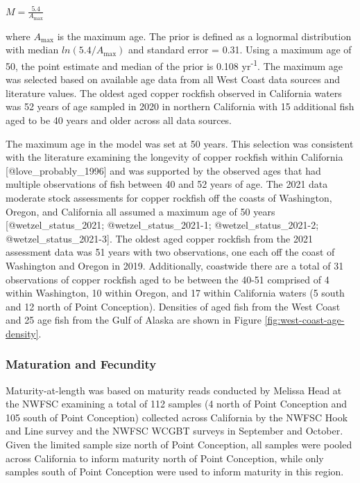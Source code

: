 \documentclass[11pt,
  letterpaper,
]{article}
\begin{document}
\begin{centering}

$M=\frac{5.4}{A_{\text{max}}}$

\end{centering}

\vspace{0.5cm}

where \(A_{\text{max}}\) is the maximum age. The prior is defined as a lognormal distribution with median \(ln(5.4/A_{\text{max}})\) and standard error = 0.31. Using a maximum age of 50, the point estimate and median of the prior is 0.108 yr\textsuperscript{-1}. The maximum age was selected based on available age data from all West Coast data sources and literature values. The oldest aged copper rockfish observed in California waters was 52 years of age sampled in 2020 in northern California with 15 additional fish aged to be 40 years and older across all data sources.

The maximum age in the model was set at 50 years. This selection was consistent with the literature examining the longevity of copper rockfish within California {[}@love\_probably\_1996{]} and was supported by the observed ages that had multiple observations of fish between 40 and 52 years of age. The 2021 data moderate stock assessments for copper rockfish off the coasts of Washington, Oregon, and California all assumed a maximum age of 50 years {[}@wetzel\_status\_2021; @wetzel\_status\_2021-1; @wetzel\_status\_2021-2; @wetzel\_status\_2021-3{]}. The oldest aged copper rockfish from the 2021 assessment data was 51 years with two observations, one each off the coast of Washington and Oregon in 2019. Additionally, coastwide there are a total of 31 observations of copper rockfish aged to be between the 40-51 comprised of 4 within Washington, 10 within Oregon, and 17 within California waters (5 south and 12 north of Point Conception). Densities of aged fish from the West Coast and 25 age fish from the Gulf of Alaska are shown in Figure \ref{fig:west-coast-age-density}.

\subsubsection{Maturation and Fecundity}\label{maturation-and-fecundity}

Maturity-at-length was based on maturity reads conducted by Melissa Head at the NWFSC examining a total of 112 samples (4 north of Point Conception and 105 south of Point Conception) collected across California by the NWFSC Hook and Line survey and the NWFSC WCGBT surveys in September and October. Given the limited sample size north of Point Conception, all samples were pooled across California to inform maturity north of Point Conception, while only samples south of Point Conception were used to inform maturity in this region.
\end{document}
